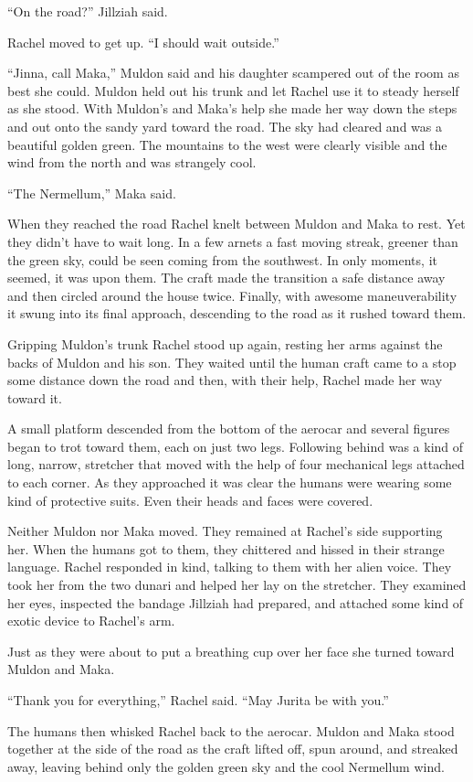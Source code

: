 ``On the road?'' Jillziah said.

Rachel moved to get up. ``I should wait outside.''

``Jinna, call Maka,'' Muldon said and his daughter scampered out of the room as best she could.
Muldon held out his trunk and let Rachel use it to steady herself as she stood. With Muldon's
and Maka's help she made her way down the steps and out onto the sandy yard toward the road. The
sky had cleared and was a beautiful golden green. The mountains to the west were clearly visible
and the wind from the north and was strangely cool.

``The Nermellum,'' Maka said.

When they reached the road Rachel knelt between Muldon and Maka to rest. Yet they didn't have to
wait long. In a few arnets a fast moving streak, greener than the green sky, could be seen
coming from the southwest. In only moments, it seemed, it was upon them. The craft made the
transition a safe distance away and then circled around the house twice. Finally, with awesome
maneuverability it swung into its final approach, descending to the road as it rushed toward
them.

Gripping Muldon's trunk Rachel stood up again, resting her arms against the backs of Muldon and
his son. They waited until the human craft came to a stop some distance down the road and then,
with their help, Rachel made her way toward it.

A small platform descended from the bottom of the aerocar and several figures began to trot
toward them, each on just two legs. Following behind was a kind of long, narrow, stretcher that
moved with the help of four mechanical legs attached to each corner. As they approached it was
clear the humans were wearing some kind of protective suits. Even their heads and faces were
covered.

Neither Muldon nor Maka moved. They remained at Rachel's side supporting her. When the humans
got to them, they chittered and hissed in their strange language. Rachel responded in kind,
talking to them with her alien voice. They took her from the two dunari and helped her lay on
the stretcher. They examined her eyes, inspected the bandage Jillziah had prepared, and attached
some kind of exotic device to Rachel's arm.

Just as they were about to put a breathing cup over her face she turned toward Muldon and Maka.

``Thank you for everything,'' Rachel said. ``May Jurita be with you.''

The humans then whisked Rachel back to the aerocar. Muldon and Maka stood together at the side
of the road as the craft lifted off, spun around, and streaked away, leaving behind only the
golden green sky and the cool Nermellum wind.
